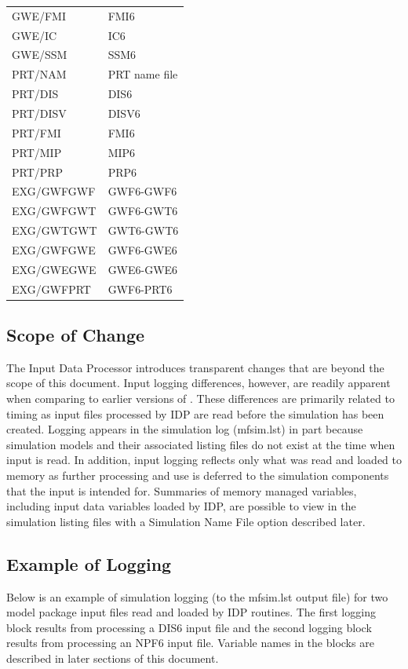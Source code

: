 \begin{longtable}{p{6cm} p{4cm}}
GWE/FMI & FMI6 \\
GWE/IC & IC6 \\
GWE/SSM & SSM6 \\
\hline
PRT/NAM & PRT name file \\
PRT/DIS & DIS6 \\ 
PRT/DISV & DISV6 \\
PRT/FMI & FMI6 \\
PRT/MIP & MIP6 \\
PRT/PRP & PRP6 \\
\hline
EXG/GWFGWF & GWF6-GWF6 \\
EXG/GWFGWT & GWF6-GWT6 \\
EXG/GWTGWT & GWT6-GWT6 \\
EXG/GWFGWE & GWF6-GWE6 \\
EXG/GWEGWE & GWE6-GWE6 \\
EXG/GWFPRT & GWF6-PRT6 \\
\end{longtable}
\normalsize

\subsection{Scope of Change}

The Input Data Processor introduces transparent changes that are beyond the scope of this document.  Input logging differences, however, are readily apparent when comparing to earlier versions of \mf.  These differences are primarily related to timing as input files processed by IDP are read before the simulation has been created.  Logging appears in the simulation log (mfsim.lst) in part because simulation models and their associated listing files do not exist at the time when input is read.  In addition, input logging reflects only what was read and loaded to memory as further processing and use is deferred to the simulation components that the input is intended for.  Summaries of memory managed variables, including input data variables loaded by IDP, are possible to view in the simulation listing files with a Simulation Name File option described later. 

\subsection{Example of Logging}

Below is an example of simulation logging (to the mfsim.lst output file) for two model package input files read and loaded by IDP routines.  The first logging block results from processing a DIS6 input file and the second logging block results from processing an NPF6 input file.  Variable names in the blocks are described in later sections of this document.

